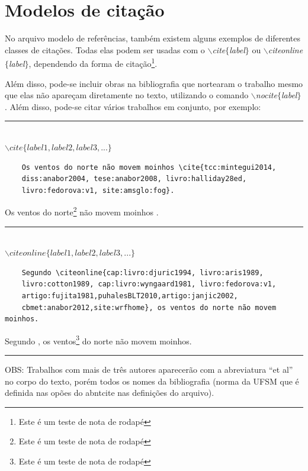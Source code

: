 \documentclass[oneside,openright,12pt]{ufsm_2015} %
\begin{document}
   \section{Modelos de citação}
      \par No arquivo modelo de referências, também existem alguns exemplos de diferentes classes de citações. Todas elas podem ser usadas com o \textit{$\backslash$cite$\{$label$\}$} ou \textit{$\backslash$citeonline$\{$label$\}$}, dependendo da forma de citação\footnote{Este é um teste de nota de rodapé}.

	\par Além disso, pode-se incluir obras na bibliografia que nortearam o trabalho mesmo que elas não apareçam diretamente no texto, utilizando o comando \textit{$\backslash$nocite$\{$label$\}$}. Além disso, pode-se citar vários trabalhos em conjunto, por exemplo:
	
	\begin{center}\rule{0.5\textwidth}{1pt}\\$\backslash cite\{label1,label2,label3,...\}$\end{center}

	\begin{verbatim}
	Os ventos do norte não movem moinhos \cite{tcc:mintegui2014, 
	diss:anabor2004, tese:anabor2008, livro:halliday28ed, 
	livro:fedorova:v1, site:amsglo:fog}.
	\end{verbatim}
	    
	\par Os ventos do norte\footnote{Este é um teste de nota de rodapé} não movem moinhos \cite{tcc:mintegui2014,diss:anabor2004,tese:anabor2008,livro:halliday28ed,livro:fedorova:v1,site:amsglo:fog}.
        
        \begin{center}\rule{0.5\textwidth}{1pt}\\$\backslash citeonline\{label1,label2,label3,...\}$\end{center}
        
	\begin{verbatim}
	Segundo \citeonline{cap:livro:djuric1994, livro:aris1989, 
	livro:cotton1989, cap:livro:wyngaard1981, livro:fedorova:v1, 
	artigo:fujita1981,puhalesBLT2010,artigo:janjic2002,
	cbmet:anabor2012,site:wrfhome}, os ventos do norte não movem moinhos.
	\end{verbatim}
            
        \par Segundo , os ventos\footnote{Este é um teste de nota de rodapé} do norte não movem moinhos.
        \begin{center}\rule{0.5\textwidth}{1pt}\end{center}   
         \par OBS: Trabalhos com mais de três autores aparecerão com a abreviatura ``et al'' no corpo do texto, porém todos os nomes da bibliografia (norma da UFSM que é definida nas opões do abntcite nas definições do arquivo). 
  
\end{document}
